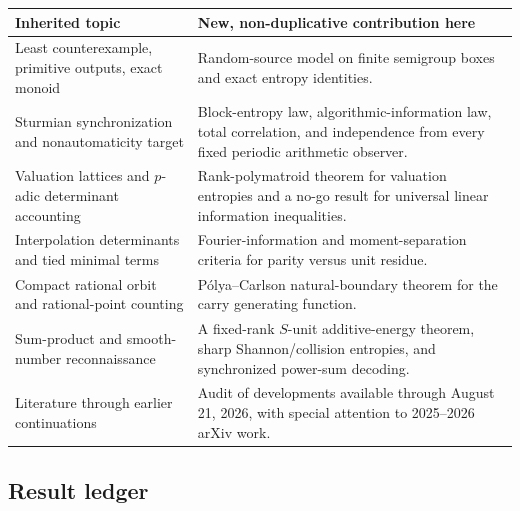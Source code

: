 \documentclass[11pt,oneside]{article}
\theoremstyle{definition}
\theoremstyle{remark}
\begin{document}
\begin{longtable}{p{}p{}}
\toprule
\textbf{Inherited topic} & \textbf{New, non-duplicative contribution here}\\
\midrule
Least counterexample, primitive outputs, exact monoid & Random-source model on finite semigroup boxes and exact entropy identities.\\
Sturmian synchronization and nonautomaticity target & Block-entropy law, algorithmic-information law, total correlation, and independence from every fixed periodic arithmetic observer.\\
Valuation lattices and $p$-adic determinant accounting & Rank-polymatroid theorem for valuation entropies and a no-go result for universal linear information inequalities.\\
Interpolation determinants and tied minimal terms & Fourier-information and moment-separation criteria for parity versus unit residue.\\
Compact rational orbit and rational-point counting & P\'olya--Carlson natural-boundary theorem for the carry generating function.\\
Sum-product and smooth-number reconnaissance & A fixed-rank $S$-unit additive-energy theorem, sharp Shannon/collision entropies, and synchronized power-sum decoding.\\
Literature through earlier continuations & Audit of developments available through August 21, 2026, with special attention to 2025--2026 arXiv work.\\
\bottomrule
\end{longtable}

\subsection{Result ledger}
\end{document}
